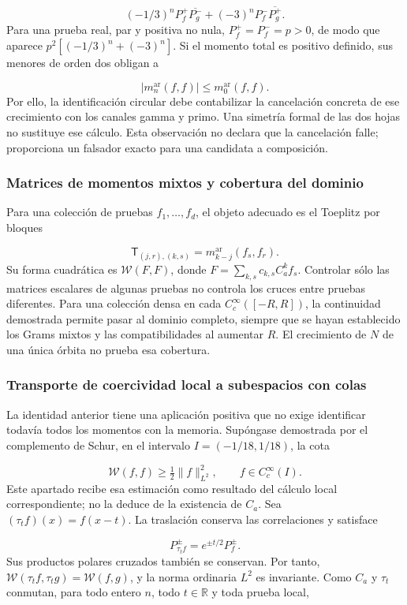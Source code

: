 \[
(-1/3)^nP_f^+\overline{P_g^-}
+(-3)^nP_f^-\overline{P_g^+}.
\]
Para una prueba real, par y positiva no nula, \(P_f^+=P_f^-=p>0\), de modo que aparece \(p^2[(-1/3)^n+(-3)^n]\). Si el momento total es positivo definido, sus menores de orden dos obligan a

\[
|m_n^{\mathrm{ar}}(f,f)|\le m_0^{\mathrm{ar}}(f,f).
\]
Por ello, la identificación circular debe contabilizar la cancelación concreta de ese crecimiento con los canales gamma y primo. Una simetría formal de las dos hojas no sustituye ese cálculo. Esta observación no declara que la cancelación falle; proporciona un falsador exacto para una candidata a composición.


\subsubsection{Matrices de momentos mixtos y cobertura del dominio}
\label{tm-add-m6-2}
Para una colección de pruebas \(f_1,\ldots,f_d\), el objeto adecuado es el Toeplitz por bloques

\[
\mathsf T_{(j,r),(k,s)}
=m_{k-j}^{\mathrm{ar}}(f_s,f_r).
\]
Su forma cuadrática es \(\mathscr W(F,F)\), donde \(F=\sum_{k,s}c_{k,s}C_a^k f_s\). Controlar sólo las matrices escalares de algunas pruebas no controla los cruces entre pruebas diferentes. Para una colección densa en cada \(C_c^\infty([-R,R])\), la continuidad demostrada permite pasar al dominio completo, siempre que se hayan establecido los Grams mixtos y las compatibilidades al aumentar \(R\). El crecimiento de \(N\) de una única órbita no prueba esa cobertura.


\subsubsection{Transporte de coercividad local a subespacios con colas}
\label{tm-add-m6-3}
\label{tm-add:familias-transportadas}
La identidad anterior tiene una aplicación positiva que no exige identificar todavía todos los momentos con la memoria. Supóngase demostrada por el complemento de Schur, en el intervalo \(I=(-1/18,1/18)\), la cota

\[
\mathscr W(f,f)\geq\tfrac12\|f\|_{L^2}^2,
\qquad f\in C_c^\infty(I).
\]
Este apartado recibe esa estimación como resultado del cálculo local correspondiente; no la deduce de la existencia de \(C_a\). Sea \((\tau_t f)(x)=f(x-t)\). La traslación conserva las correlaciones y satisface

\[
P_{\tau_t f}^{\pm}=e^{\pm t/2}P_f^{\pm}.
\]
Sus productos polares cruzados también se conservan. Por tanto, \(\mathscr W(\tau_t f,\tau_t g)=\mathscr W(f,g)\), y la norma ordinaria \(L^2\) es invariante. Como \(C_a\) y \(\tau_t\) conmutan, para todo entero \(n\), todo \(t\in\mathbb R\) y toda prueba local,

